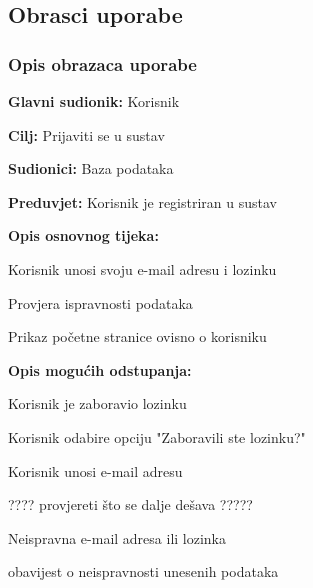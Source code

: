 			\subsection{Obrasci uporabe}
				
				
				\subsubsection{Opis obrazaca uporabe}
					

					\noindent {}
					\begin{packed_item}
	
						\item \textbf{Glavni sudionik: }Korisnik
						\item  \textbf{Cilj: } Prijaviti se u sustav
						\item  \textbf{Sudionici: } Baza podataka
						\item  \textbf{Preduvjet: } Korisnik je registriran u sustav
						\item  \textbf{Opis osnovnog tijeka: }
						
						\item[] \begin{packed_enum}
	
							\item Korisnik unosi svoju e-mail adresu i lozinku
							\item Provjera ispravnosti podataka
							\item Prikaz početne stranice ovisno o korisniku
						\end{packed_enum}
						
						\item  \textbf{Opis mogućih odstupanja:}
						
						\item[] \begin{packed_item}
							\item[1.a] Korisnik je zaboravio lozinku
							\item[] \begin{packed_enum}
								
								\item Korisnik odabire opciju "Zaboravili ste lozinku?"
								\item Korisnik unosi e-mail adresu
								\item ???? provjereti što se dalje dešava ?????
								
							\end{packed_enum}
							\item[2.a] Neispravna e-mail adresa ili lozinka
							\item[] \begin{packed_enum}
								
								\item obavijest o neispravnosti unesenih podataka
								
							\end{packed_enum}
							
						\end{packed_item}
					\end{packed_item}
				
